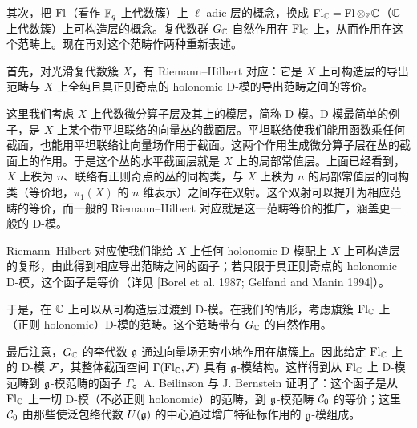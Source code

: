 其次，把 $\operatorname{Fl}$（看作 $\mathbb{F}_q$ 上代数簇）上 $\ell$-adic 层的概念，换成 $\operatorname{Fl}_{\mathbb{C}}=\operatorname{Fl}\otimes_{\mathbb{Z}}\mathbb{C}$（$\mathbb{C}$ 上代数簇）上可构造层的概念。复代数群 $G_{\mathbb{C}}$ 自然作用在 $\operatorname{Fl}_{\mathbb{C}}$ 上，从而作用在这个范畴上。现在再对这个范畴作两种重新表述。

首先，对光滑复代数簇 $X$，有 Riemann--Hilbert 对应：它是 $X$ 上可构造层的导出范畴与 $X$ 上全纯且具正则奇点的 holonomic D-模的导出范畴之间的等价。

这里我们考虑 $X$ 上代数微分算子层及其上的模层，简称 D-模。D-模最简单的例子，是 $X$ 上某个带平坦联络的向量丛的截面层。平坦联络使我们能用函数乘任何截面，也能用平坦联络让向量场作用于截面。这两个作用生成微分算子层在丛的截面上的作用。于是这个丛的水平截面层就是 $X$ 上的局部常值层。上面已经看到，$X$ 上秩为 $n$、联络有正则奇点的丛的同构类，与 $X$ 上秩为 $n$ 的局部常值层的同构类（等价地，$\pi_1(X)$ 的 $n$ 维表示）之间存在双射。这个双射可以提升为相应范畴的等价，而一般的 Riemann--Hilbert 对应就是这一范畴等价的推广，涵盖更一般的 D-模。

Riemann--Hilbert 对应使我们能给 $X$ 上任何 holonomic D-模配上 $X$ 上可构造层的复形，由此得到相应导出范畴之间的函子；若只限于具正则奇点的 holonomic D-模，这个函子是等价（详见 [Borel et al. 1987; Gelfand and Manin 1994]）。

于是，在 $\mathbb{C}$ 上可以从可构造层过渡到 D-模。在我们的情形，考虑旗簇 $\operatorname{Fl}_{\mathbb{C}}$ 上（正则 holonomic）D-模的范畴。这个范畴带有 $G_{\mathbb{C}}$ 的自然作用。

最后注意，$G_{\mathbb{C}}$ 的李代数 $\mathfrak{g}$ 通过向量场无穷小地作用在旗簇上。因此给定 $\operatorname{Fl}_{\mathbb{C}}$ 上的 D-模 $\mathcal{F}$，其整体截面空间 $\Gamma(\operatorname{Fl}_{\mathbb{C}},\mathcal{F})$ 具有 $\mathfrak{g}$-模结构。这样得到从 $\operatorname{Fl}_{\mathbb{C}}$ 上 D-模范畴到 $\mathfrak{g}$-模范畴的函子 $\Gamma$。A. Beilinson 与 J. Bernstein 证明了：这个函子是从 $\operatorname{Fl}_{\mathbb{C}}$ 上一切 D-模（不必正则 holonomic）的范畴，到 $\mathfrak{g}$-模范畴 $\mathcal{C}_0$ 的等价；这里 $\mathcal{C}_0$ 由那些使泛包络代数 $U(\mathfrak{g})$ 的中心通过增广特征标作用的 $\mathfrak{g}$-模组成。

